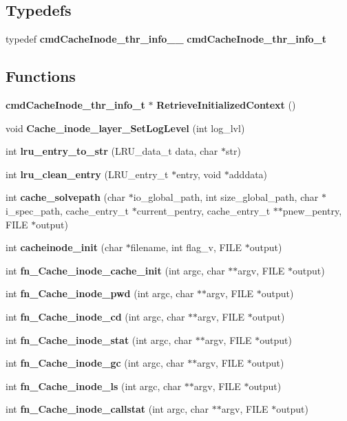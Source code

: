 \subsection*{Typedefs}
\begin{CompactItemize}
\item 
typedef {\bf cmd\-Cache\-Inode\_\-thr\_\-info\_\-\_\-} {\bf cmd\-Cache\-Inode\_\-thr\_\-info\_\-t}
\end{CompactItemize}
\subsection*{Functions}
\begin{CompactItemize}
\item 
{\bf cmd\-Cache\-Inode\_\-thr\_\-info\_\-t} $\ast$ {\bf Retrieve\-Initialized\-Context} ()
\item 
void {\bf Cache\_\-inode\_\-layer\_\-Set\-Log\-Level} (int log\_\-lvl)
\item 
int {\bf lru\_\-entry\_\-to\_\-str} (LRU\_\-data\_\-t data, char $\ast$str)
\item 
int {\bf lru\_\-clean\_\-entry} (LRU\_\-entry\_\-t $\ast$entry, void $\ast$adddata)
\item 
int {\bf cache\_\-solvepath} (char $\ast$io\_\-global\_\-path, int size\_\-global\_\-path, char $\ast$i\_\-spec\_\-path, cache\_\-entry\_\-t $\ast$current\_\-pentry, cache\_\-entry\_\-t $\ast$$\ast$pnew\_\-pentry, FILE $\ast$output)
\item 
int {\bf cacheinode\_\-init} (char $\ast$filename, int flag\_\-v, FILE $\ast$output)
\item 
int {\bf fn\_\-Cache\_\-inode\_\-cache\_\-init} (int argc, char $\ast$$\ast$argv, FILE $\ast$output)
\item 
int {\bf fn\_\-Cache\_\-inode\_\-pwd} (int argc, char $\ast$$\ast$argv, FILE $\ast$output)
\item 
int {\bf fn\_\-Cache\_\-inode\_\-cd} (int argc, char $\ast$$\ast$argv, FILE $\ast$output)
\item 
int {\bf fn\_\-Cache\_\-inode\_\-stat} (int argc, char $\ast$$\ast$argv, FILE $\ast$output)
\item 
int {\bf fn\_\-Cache\_\-inode\_\-gc} (int argc, char $\ast$$\ast$argv, FILE $\ast$output)
\item 
int {\bf fn\_\-Cache\_\-inode\_\-ls} (int argc, char $\ast$$\ast$argv, FILE $\ast$output)
\item 
int {\bf fn\_\-Cache\_\-inode\_\-callstat} (int argc, char $\ast$$\ast$argv, FILE $\ast$output)

\end{CompactItemize}
